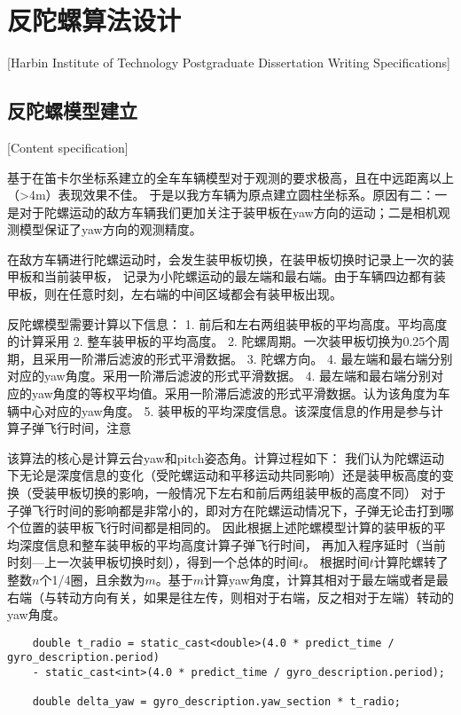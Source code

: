 

\chapter[反陀螺算法设计]{反陀螺算法设计}[Harbin Institute of Technology Postgraduate Dissertation Writing Specifications]

\section{反陀螺模型建立}[Content specification]

基于在笛卡尔坐标系建立的全车车辆模型对于观测的要求极高，且在中远距离以上（>4m）表现效果不佳。
于是以我方车辆为原点建立圆柱坐标系。原因有二：一是对于陀螺运动的敌方车辆我们更加关注于装甲板在yaw方向的运动；二是相机观测模型保证了yaw方向的观测精度。


在敌方车辆进行陀螺运动时，会发生装甲板切换，在装甲板切换时记录上一次的装甲板和当前装甲板，
记录为小陀螺运动的最左端和最右端。由于车辆四边都有装甲板，则在任意时刻，左右端的中间区域都会有装甲板出现。

反陀螺模型需要计算以下信息：
1. 前后和左右两组装甲板的平均高度。平均高度的计算采用
2. 整车装甲板的平均高度。
2. 陀螺周期。一次装甲板切换为0.25个周期，且采用一阶滞后滤波的形式平滑数据。
3. 陀螺方向。
4. 最左端和最右端分别对应的yaw角度。采用一阶滞后滤波的形式平滑数据。
4. 最左端和最右端分别对应的yaw角度的等权平均值。采用一阶滞后滤波的形式平滑数据。认为该角度为车辆中心对应的yaw角度。
5. 装甲板的平均深度信息。该深度信息的作用是参与计算子弹飞行时间，注意

该算法的核心是计算云台yaw和pitch姿态角。计算过程如下：
我们认为陀螺运动下无论是深度信息的变化（受陀螺运动和平移运动共同影响）还是装甲板高度的变换（受装甲板切换的影响，一般情况下左右和前后两组装甲板的高度不同）
对于子弹飞行时间的影响都是非常小的，即对方在陀螺运动情况下，子弹无论击打到哪个位置的装甲板飞行时间都是相同的。
因此根据上述陀螺模型计算的装甲板的平均深度信息和整车装甲板的平均高度计算子弹飞行时间，
再加入程序延时（当前时刻—上一次装甲板切换时刻），得到一个总体的时间$t$。
根据时间$t$计算陀螺转了整数$n$个1/4圈，且余数为$m$。基于$m$计算yaw角度，计算其相对于最左端或者是最右端（与转动方向有关，如果是往左传，则相对于右端，反之相对于左端）转动的yaw角度。

\begin{lstlisting}
    double t_radio = static_cast<double>(4.0 * predict_time / gyro_description.period) 
    - static_cast<int>(4.0 * predict_time / gyro_description.period);

    double delta_yaw = gyro_description.yaw_section * t_radio;
\end{lstlisting}

